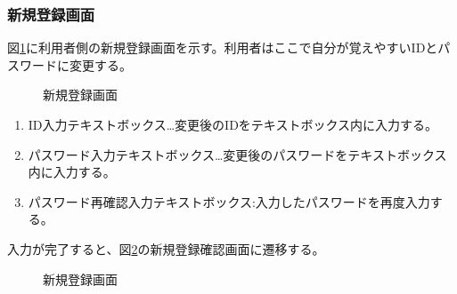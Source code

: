 \documentclass[a4j]{jarticle}
\begin{document}
\subsubsection{新規登録画面}
図\ref{fig:subscribe_user}に利用者側の新規登録画面を示す。利用者はここで自分が覚えやすいIDとパスワードに変更する。
\begin{figure}[H]
\centering
{}
\caption{新規登録画面}
\label{fig:subscribe_user}
\end{figure}
\begin{enumerate}
  \renewcommand{\labelenumi}{\textcircled{\scriptsize \theenumi}}

\item ID入力テキストボックス…変更後のIDをテキストボックス内に入力する。
\item パスワード入力テキストボックス…変更後のパスワードをテキストボックス内に入力する。
\item パスワード再確認入力テキストボックス:入力したパスワードを再度入力する。
\end{enumerate}
入力が完了すると、図\ref{fig:subscribe_ok}の新規登録確認画面に遷移する。
\begin{figure}[H]
\centering
{}
\caption{新規登録画面}
\label{fig:subscribe_ok}
\end{figure}
\end{document}
